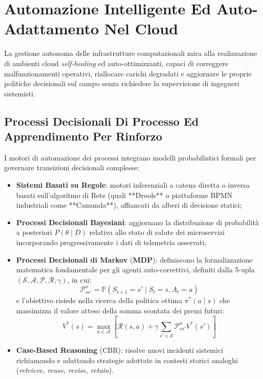 \documentclass[11pt, a4paper]{article}
\begin{document}
\section{Automazione Intelligente Ed Auto-Adattamento Nel Cloud}

La gestione autonoma delle infrastrutture computazionali mira alla realizzazione di ambienti cloud \emph{self-healing} ed auto-ottimizzanti, capaci di correggere malfunzionamenti operativi, riallocare carichi degradati e aggiornare le proprie politiche decisionali sul campo senza richiedere la supervisione di ingegneri sistemisti.



\subsection{Processi Decisionali Di Processo Ed Apprendimento Per Rinforzo}

I motori di automazione dei processi integrano modelli probabilistici formali per governare transizioni decisionali complesse:
\begin{itemize}
    \item \textbf{Sistemi Basati su Regole}: motori inferenziali a catena diretta o inversa basati sull'algoritmo di Rete (quali **Drools** o piattaforme BPMN industriali come **Camunda**), affiancati da alberi di decisione statici;
    \item \textbf{Processi Decisionali Bayesiani}: aggiornano la distribuzione di probabilità a posteriori $P(\theta \mid D)$ relativa allo stato di salute dei microservizi incorporando progressivamente i dati di telemetria osservati;
    \item \textbf{Processi Decisionali di Markov} (\textbf{MDP}): definiscono la formalizzazione matematica fondamentale per gli agenti auto-correttivi, definiti dalla 5-upla $(\mathcal{S}, \mathcal{A}, \mathcal{P}, \mathcal{R}, \gamma)$, in cui:
    \begin{equation}
        \mathcal{P}_{ss'}^a = \mathbb{P}(S_{t+1} = s' \mid S_t = s, A_t = a)
    \end{equation}
    e l'obiettivo risiede nella ricerca della politica ottima $\pi^*(a \mid s)$ che massimizza il valore atteso della somma scontata dei premi futuri:
    \begin{equation}
        V^*(s) = \max_{a \in \mathcal{A}} \left[ \mathcal{R}(s, a) + \gamma \sum_{s' \in \mathcal{S}} \mathcal{P}_{ss'}^a V^*(s') \right]
    \end{equation}
    \item \textbf{Case-Based Reasoning} (CBR): risolve nuovi incidenti sistemici richiamando e adattando strategie adottate in contesti storici analoghi (\emph{retrieve, reuse, revise, retain}).
\end{itemize}
\end{document}
